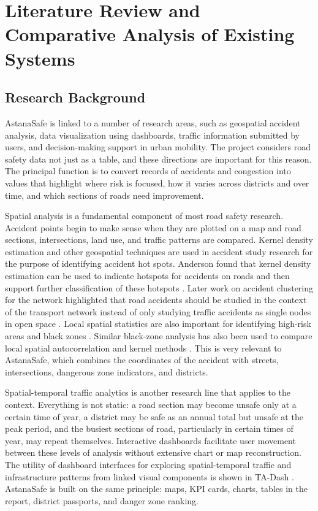 ﻿\documentclass[12pt,a4paper]{report}
\begin{document}
\section{Literature Review and Comparative Analysis of Existing Systems}

\subsection{Research Background}

AstanaSafe is linked to a number of research areas, such as geospatial accident analysis, data visualization using dashboards, traffic information submitted by users, and decision-making support in urban mobility. The project considers road safety data not just as a table, and these directions are important for this reason. The principal function is to convert records of accidents and congestion into values that highlight where risk is focused, how it varies across districts and over time, and which sections of roads need improvement.

Spatial analysis is a fundamental component of most road safety research. Accident points begin to make sense when they are plotted on a map and road sections, intersections, land use, and traffic patterns are compared. Kernel density estimation and other geospatial techniques are used in accident study research for the purpose of identifying accident hot spots. Anderson found that kernel density estimation can be used to indicate hotspots for accidents on roads and then support further classification of these hotspots \cite{anderson2009}. Later work on accident clustering for the network highlighted that road accidents should be studied in the context of the transport network instead of only studying traffic accidents as single nodes in open space \cite{xie2013}. Local spatial statistics are also important for identifying high-risk areas and black zones \cite{anselin1995}. Similar black-zone analysis has also been used to compare local spatial autocorrelation and kernel methods \cite{flahaut2003}. This is very relevant to AstanaSafe, which combines the coordinates of the accident with streets, intersections, dangerous zone indicators, and districts.

Spatial-temporal traffic analytics is another research line that applies to the context. Everything is not static: a road section may become unsafe only at a certain time of year, a district may be safe as an annual total but unsafe at the peak period, and the busiest sections of road, particularly in certain times of year, may repeat themselves. Interactive dashboards facilitate user movement between these levels of analysis without extensive chart or map reconstruction. The utility of dashboard interfaces for exploring spatial-temporal traffic and infrastructure patterns from linked visual components is shown in TA-Dash \cite{tempelmeier2020}. AstanaSafe is built on the same principle: maps, KPI cards, charts, tables in the report, district passports, and danger zone ranking.
\end{document}

